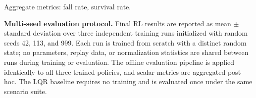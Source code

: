 \documentclass[conference]{IEEEtran}
\begin{document}
Aggregate metrics: fall rate, survival rate.

\noindent\textbf{Multi-seed evaluation protocol.}
Final RL results are reported as mean $\pm$ standard deviation over three
independent training runs initialized with random seeds 42, 113, and 999.
Each run is trained from scratch with a distinct random state;
no parameters, replay data, or normalization statistics are shared between
runs during training or evaluation.
The offline evaluation pipeline is applied identically to all three
trained policies, and scalar metrics are aggregated post-hoc.
The LQR baseline requires no training and is evaluated once under the
same scenario suite.

\begin{table}[t]
\centering
\caption{RL policy vs.\ LQR baseline comparison (planned).
All result cells to be filled after training.}
\label{tab:rl_vs_lqr}
\end{table}
\end{document}
